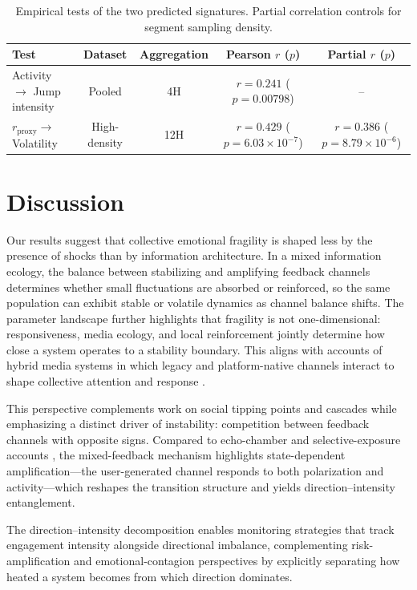 \documentclass[11pt]{article}
\begin{document}
\begin{table}[H]
  \centering
  \caption{Empirical tests of the two predicted signatures. Partial correlation controls for segment sampling density.}
  \label{tab:empirical}
  \footnotesize
  \setlength{\tabcolsep}{4pt}
  \begin{tabularx}{\linewidth}{YCCCC}
    \hline
    Test & Dataset & Aggregation & Pearson $r$ ($p$) & Partial $r$ ($p$) \\
    \hline
    Activity $\to$ Jump intensity & Pooled & 4H & $r=0.241$ ($p=0.00798$) & -- \\
    $r_{\text{proxy}}\to$ Volatility & High-density & 12H & $r=0.429$ ($p=6.03\times 10^{-7}$) & $r=0.386$ ($p=8.79\times 10^{-6}$) \\
    \hline
  \end{tabularx}
\end{table}

\FloatBarrier
\section{Discussion}
Our results suggest that collective emotional fragility is shaped less by the presence of shocks than by information architecture. In a mixed information ecology, the balance between stabilizing and amplifying feedback channels determines whether small fluctuations are absorbed or reinforced, so the same population can exhibit stable or volatile dynamics as channel balance shifts. The parameter landscape further highlights that fragility is not one-dimensional: responsiveness, media ecology, and local reinforcement jointly determine how close a system operates to a stability boundary. This aligns with accounts of hybrid media systems in which legacy and platform-native channels interact to shape collective attention and response \citep{Chadwick2017}.

This perspective complements work on social tipping points and cascades \citep{Granovetter1978,Watts2002,Centola2018Tipping,Baronchelli2018} while emphasizing a distinct driver of instability: competition between feedback channels with opposite signs. Compared to echo-chamber and selective-exposure accounts \citep{Bakshy2015,DelVicario2016SciRep,DelVicario2016PNAS}, the mixed-feedback mechanism highlights state-dependent amplification---the user-generated channel responds to both polarization and activity---which reshapes the transition structure and yields direction--intensity entanglement.

The direction--intensity decomposition enables monitoring strategies that track engagement intensity alongside directional imbalance, complementing risk-amplification and emotional-contagion perspectives \citep{Kasperson1988,Kramer2014,Fan2014,Brady2023} by explicitly separating how heated a system becomes from which direction dominates.
\end{document}
